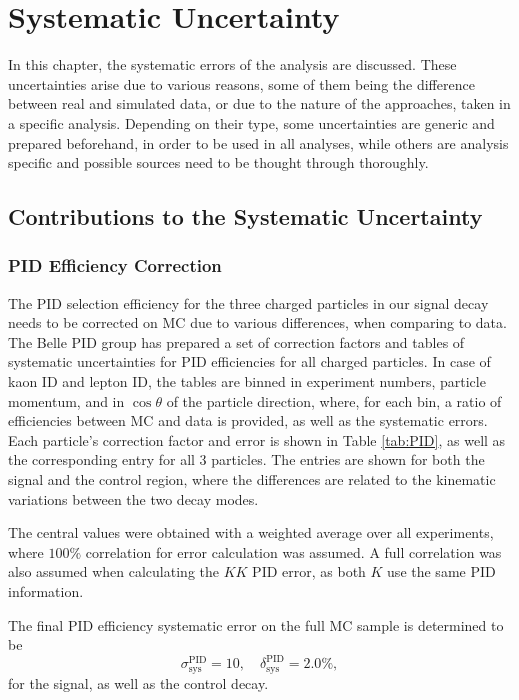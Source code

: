 \chapter{Systematic Uncertainty}\label{sec:systematic-uncertainty}
In this chapter, the systematic errors of the analysis are discussed. These uncertainties arise due to various reasons, some of them being the difference between real and simulated data, or due to the nature of the approaches, taken in a specific analysis. Depending on their type, some uncertainties are generic and prepared beforehand, in order to be used in all analyses, while others are analysis specific and possible sources need to be thought through thoroughly.

\section{Contributions to the Systematic Uncertainty}

\subsection{PID Efficiency Correction}\label{sec:pid-efficiency-correction}

The PID selection efficiency for the three charged particles in our signal decay needs to be corrected on MC due to various differences, when comparing to data. The Belle PID group has prepared a set of correction factors and tables of systematic uncertainties for PID efficiencies for all charged particles. In case of kaon ID and lepton ID, the tables are binned in experiment numbers, particle momentum, and in $\cos\theta$ of the particle direction, where, for each bin, a ratio of efficiencies between MC and data is provided, as well as the systematic errors. Each particle's correction factor and error is shown in Table \ref{tab:PID}, as well as the corresponding entry for all 3 particles. The entries are shown for both the signal and the control region, where the differences are related to the kinematic variations between the two decay modes.

The central values were obtained with a weighted average over all experiments, where $100\%$ correlation for error calculation was assumed. A full correlation was also assumed when calculating the $KK$ PID error, as both $K$ use the same PID information.

The final PID efficiency systematic error on the full MC sample is determined to be
\begin{equation}
\sigma_{\mathrm{sys}}^{\mathrm{PID}} = 10,\quad \delta_{\mathrm{sys}}^{\mathrm{PID}} = 2.0\%,
\end{equation}
for the signal, as well as the control decay.

